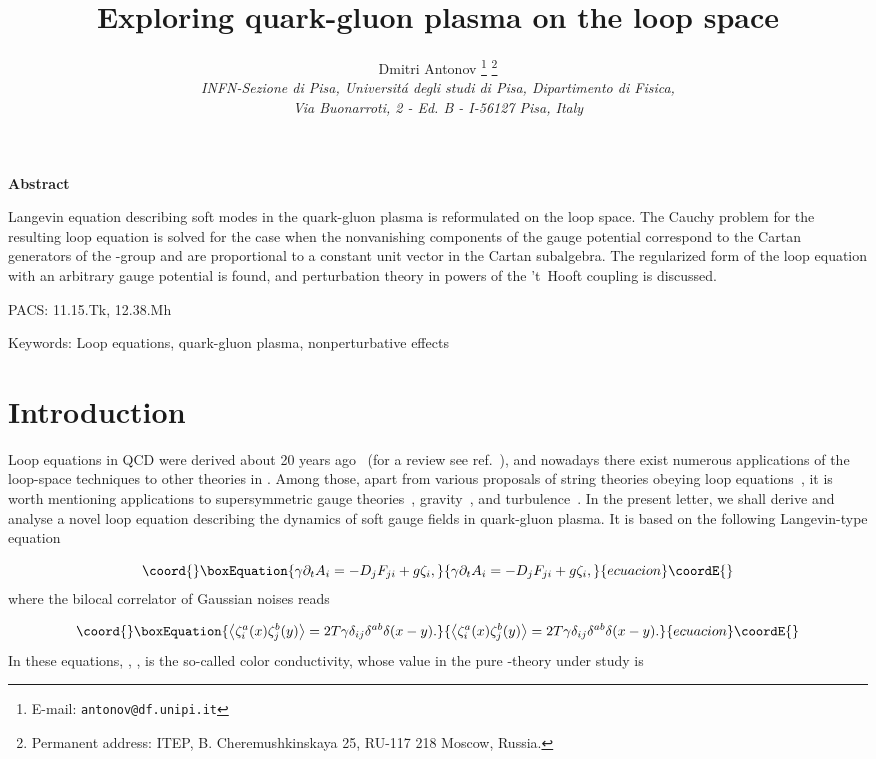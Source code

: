 \documentclass[a4paper,12pt]{article}
\title{
\vspace{-3mm}
\rightline{\small IFUP-TH 2002/29}
\vspace{8mm}
\bf Exploring quark-gluon plasma on the loop space}
\author{
Dmitri Antonov \thanks{
E-mail: {\tt antonov@df.unipi.it}}
\thanks{Permanent address:
ITEP, B. Cheremushkinskaya 25, RU-117 218 Moscow, Russia.}\\
{\it INFN-Sezione di Pisa, Universit\'a degli studi di Pisa,
Dipartimento di Fisica,}\\
{\it Via Buonarroti, 2 - Ed. B -
I-56127 Pisa, Italy}}
\date{}
\begin{document}
\maketitle
\vspace{1mm}
\centerline{\bf {Abstract}}
\vspace{3mm}
\noindent
Langevin equation describing soft modes in the quark-gluon plasma is reformulated on the
loop space. The Cauchy problem for the resulting loop equation is solved for the
case when the nonvanishing components of the gauge potential correspond to the Cartan generators
of the \coordHE{}-group and are proportional to a constant unit vector in the Cartan subalgebra.
The regularized form of the loop equation with an arbitrary gauge potential
is found, and perturbation theory in powers of the
't~Hooft coupling is discussed.

\vspace{5mm}
\noindent
PACS: 11.15.Tk, 12.38.Mh

\vspace{5mm}
\noindent
Keywords: Loop equations, quark-gluon plasma, nonperturbative effects

\vspace{10mm}

\section{Introduction}
Loop equations in QCD were derived about 20 years ago~\cite{le} (for a review see ref.~\cite{rev}),
and nowadays there exist numerous applications of the loop-space techniques to other theories in \coordHE{}. Among those, apart from
various proposals of string theories obeying loop equations~\cite{str, dgo}, it is worth mentioning
applications to supersymmetric gauge theories~\cite{dgo, susy}, gravity~\cite{gravity}, and
turbulence~\cite{tur1, tur2}. In the present letter, we shall derive and analyse a novel loop equation
describing the dynamics of soft gauge fields in quark-gluon plasma. It is based on the following Langevin-type
equation~\cite{bod}

\begin{equation}\coord{}\boxEquation{
\label{1}
\gamma\partial_t A_i=-D_jF_{ji}+g\zeta_i,
}{
\gamma\partial_t A_i=-D_jF_{ji}+g\zeta_i,
}{ecuacion}\coordE{}\end{equation}
where the bilocal correlator of
Gaussian noises reads

\begin{equation}\coord{}\boxEquation{
\label{cO}
\left<\zeta_i^a(x)\zeta_j^b(y)\right>=2T\gamma\delta_{ij}\delta^{ab}\delta(x-y).
}{
\left<\zeta_i^a(x)\zeta_j^b(y)\right>=2T\gamma\delta_{ij}\delta^{ab}\delta(x-y).
}{ecuacion}\coordE{}\end{equation}
In these equations, \coordHE{}, \coordHE{}, \myHighlight{$\gamma$}\coordHE{} is the so-called color conductivity,
whose value in the pure \coordHE{}-theory under study is~\cite{sg}
\end{document}
